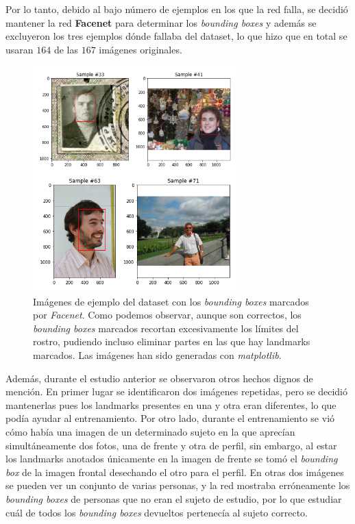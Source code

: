             \noindent Por lo tanto, debido al bajo número de ejemplos en los que la red falla, se decidió mantener la red \textbf{Facenet} para determinar los \textit{bounding boxes} y además se excluyeron los tres ejemplos dónde fallaba del dataset, lo que hizo que en total se usaran $164$ de las $167$ imágenes originales.

            \medskip 

            \begin{figure}[!h]
                \centering
                \includegraphics[width=0.7\textwidth]{img/imagenes_ejemplo_bb.png}
                \caption{Imágenes de ejemplo del dataset con los \textit{bounding boxes} marcados por \textit{Facenet}. Como podemos observar, aunque son correctos, los \textit{bounding boxes} marcados recortan excesivamente los límites del rostro, pudiendo incluso eliminar partes en las que hay landmarks marcados. Las imágenes han sido generadas con \textit{matplotlib}.}
                \label{fig:Ejemplo_bb}
            \end{figure}

            \noindent Además, durante el estudio anterior se observaron otros hechos dignos de mención. En primer lugar se identificaron dos imágenes repetidas, pero se decidió mantenerlas pues los landmarks presentes en una y otra eran diferentes, lo que podía ayudar al entrenamiento. Por otro lado, durante el entrenamiento se vió cómo había una imagen de un determinado sujeto en la que aprecían simultáneamente dos fotos, una  de frente y otra de perfil, sin embargo, al estar los landmarks anotados únicamente en la imagen de frente se tomó el \textit{bounding box} de la imagen frontal desechando el otro para el perfil. En otras dos imágenes se pueden ver un conjunto de varias personas, y la red mostraba erróneamente los \textit{bounding boxes} de personas que no eran el sujeto de estudio, por lo que estudiar cuál de todos los \textit{bounding boxes} devueltos pertenecía al sujeto correcto.

